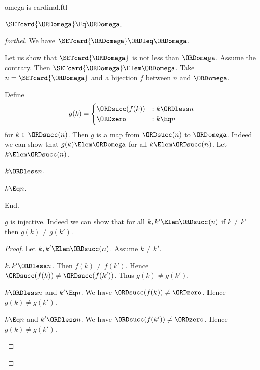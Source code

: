 \documentclass{stex}
\begin{document}
\begin{smodule}{omega-is-cardinal.ftl}

\begin{proposition}[forthel,id=SET_THEORY_07_4952029518626816]
  $\SETcard{\ORDomega} \Eq \ORDomega$.
\end{proposition}
\begin{proof}[forthel]
  We have $\SETcard{\ORDomega} \ORDleq \ORDomega$.

  Let us show that $\SETcard{\ORDomega}$ is not less than $\ORDomega$.
    Assume the contrary.
    Then $\SETcard{\ORDomega} \Elem \ORDomega$.
    Take $n = \SETcard{\ORDomega}$ and a bijection $f$ between $n$ and $\ORDomega$.

    Define \[ g(k) =
      \begin{cases}
        \ORDsucc(f(k)) & : k \ORDless n
        \\
        \ORDzero           & : k \Eq n
      \end{cases} \]
    for $k \in \ORDsucc(n)$.
    Then $g$ is a map from $\ORDsucc(n)$ to $\ORDomega$.
    Indeed we can show that $g(k) \Elem \ORDomega$ for all $k \Elem \ORDsucc(n)$.
      Let $k \Elem \ORDsucc(n)$.
      \begin{case}{$k \ORDless n$.} \end{case}
      \begin{case}{$k \Eq n$.} \end{case}
    End.

    $g$ is injective.
    Indeed we can show that for all $k, k' \Elem \ORDsucc(n)$ if $k \neq k'$
    then $g(k) \neq g(k')$. 
    \begin{proof}
      Let $k, k' \Elem \ORDsucc(n)$.
      Assume $k \neq k'$.

      \begin{case}{$k, k' \ORDless n$.}
        Then $f(k) \neq f(k')$.
        Hence $\ORDsucc(f(k)) \neq \ORDsucc(f(k'))$.
        Thus $g(k) \neq g(k')$.
      \end{case}

      \begin{case}{$k \ORDless n$ and $k' \Eq n$.}
        We have $\ORDsucc(f(k)) \neq \ORDzero$.
        Hence $g(k) \neq g(k')$.
      \end{case}

      \begin{case}{$k \Eq n$ and $k' \ORDless n$.}
        We have $\ORDsucc(f(k')) \neq \ORDzero$.
        Hence $g(k) \neq g(k')$.
      \end{case}
    \end{proof}


\end{proof}
\end{smodule}
\end{document}
